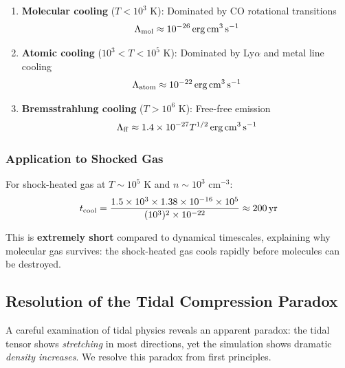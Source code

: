 \documentclass[twocolumn,amsmath,amssymb,prd,superscriptaddress,nofootinbib]{revtex4-2}
\begin{document}
\begin{enumerate}
    \item \textbf{Molecular cooling} ($T < 10^3$ K): Dominated by CO rotational transitions
    \begin{equation}
        \Lambda_{\rm mol} \approx 10^{-26}\,{\rm erg\,cm^3\,s^{-1}}
    \end{equation}

    \item \textbf{Atomic cooling} ($10^3 < T < 10^5$ K): Dominated by Ly$\alpha$ and metal line cooling
    \begin{equation}
        \Lambda_{\rm atom} \approx 10^{-22}\,{\rm erg\,cm^3\,s^{-1}}
    \end{equation}

    \item \textbf{Bremsstrahlung cooling} ($T > 10^6$ K): Free-free emission
    \begin{equation}
        \Lambda_{\rm ff} \approx 1.4 \times 10^{-27} T^{1/2}\,{\rm erg\,cm^3\,s^{-1}}
    \end{equation}
\end{enumerate}

\subsubsection{Application to Shocked Gas}

For shock-heated gas at $T \sim 10^5$ K and $n \sim 10^3$ cm$^{-3}$:
\begin{equation}
    t_{\rm cool} = \frac{1.5 \times 10^3 \times 1.38 \times 10^{-16} \times 10^5}{(10^3)^2 \times 10^{-22}} \approx 200\,{\rm yr}
\end{equation}

This is \textbf{extremely short} compared to dynamical timescales, explaining why molecular gas survives: the shock-heated gas cools rapidly before molecules can be destroyed.

\subsection{Resolution of the Tidal Compression Paradox}
\label{sec:compression_paradox}

A careful examination of tidal physics reveals an apparent paradox: the tidal tensor shows \textit{stretching} in most directions, yet the simulation shows dramatic \textit{density increases}. We resolve this paradox from first principles.
\end{document}

